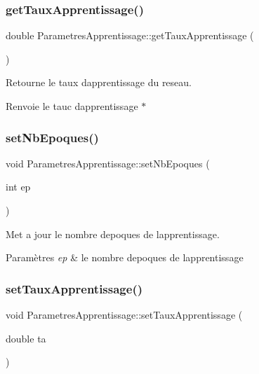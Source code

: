 \subsubsection{\texorpdfstring{get\+Taux\+Apprentissage()}{getTauxApprentissage()}}
{\footnotesize\ttfamily double Parametres\+Apprentissage\+::get\+Taux\+Apprentissage (\begin{DoxyParamCaption}{ }\end{DoxyParamCaption})}



Retourne le taux d\textquotesingle{}apprentissage du reseau. 

\begin{DoxyReturn}{Renvoie}
le tauc d\textquotesingle{}apprentissage $\ast$ 
\end{DoxyReturn}
\mbox{\label{classParametresApprentissage_a0b424fc552461e9e13d51024bd071470}} 
\subsubsection{\texorpdfstring{set\+Nb\+Epoques()}{setNbEpoques()}}
{\footnotesize\ttfamily void Parametres\+Apprentissage\+::set\+Nb\+Epoques (\begin{DoxyParamCaption}\item[{int}]{ep }\end{DoxyParamCaption})}



Met a jour le nombre d\textquotesingle{}epoques de l\textquotesingle{}apprentissage. 


\begin{DoxyParams}{Paramètres}
{\em ep} & le nombre d\textquotesingle{}epoques de l\textquotesingle{}apprentissage \\
\hline
\end{DoxyParams}
\mbox{\label{classParametresApprentissage_a13b6b90a24b4733c6b465aa74a1abda9}} 
\subsubsection{\texorpdfstring{set\+Taux\+Apprentissage()}{setTauxApprentissage()}}
{\footnotesize\ttfamily void Parametres\+Apprentissage\+::set\+Taux\+Apprentissage (\begin{DoxyParamCaption}\item[{double}]{ta }\end{DoxyParamCaption})}




